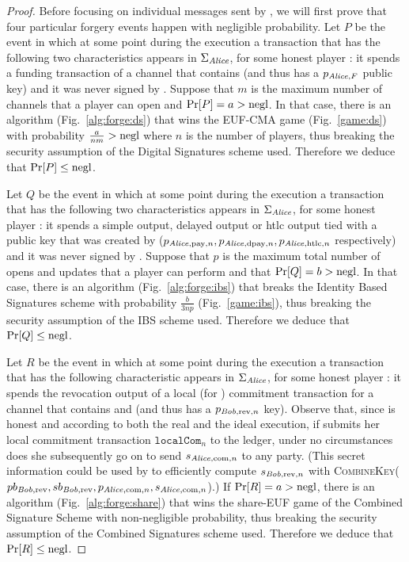\begin{proof}
  Before focusing on individual messages sent by \environment, we will first
  prove that four particular forgery events happen with negligible probability.
  Let $P$ be the event in which at some point during the execution a transaction
  that has the following two characteristics appears in $\Sigma_{\mathit{Alice}}$, for
  some honest player \alice: it spends a funding transaction of a channel that
  contains \alice{} (and thus has a $p_{\mathit{Alice}, F}$ public key) and it was never
  signed by \alice. Suppose that $m$ is the maximum number of channels that a
  player can open and $\Pr[P] = a > \text{negl}$. In that case, there is an algorithm
  (Fig.~\ref{alg:forge:ds}) that wins the \textsf{EUF-CMA} game
  (Fig.~\ref{game:ds}) with probability $\frac{a}{nm} > \text{negl}$ where $n$ is the
  number of players, thus breaking the security assumption of the Digital
  Signatures scheme used. Therefore we deduce that $\Pr[P] \leq \text{negl}$.

  Let $Q$ be the event in which at some point during the execution a transaction
  that has the following two characteristics appears in $\Sigma_{\mathit{Alice}}$, for
  some honest player \alice: it spends a simple output, delayed output or htlc
  output tied with a public key that was created by \alice{} ($p_{\mathit{Alice},
  \mathrm{pay}, n}, p_{\mathit{Alice}, \mathrm{dpay}, n}, p_{\mathit{Alice}, \mathrm{htlc}, n}$
  respectively) and it was never signed by \alice. Suppose that $p$ is the
  maximum total number of opens and updates that a player can perform and that
  $\Pr[Q] = b > \text{negl}$. In that case, there is an algorithm
  (Fig.~\ref{alg:forge:ibs}) that breaks the Identity Based Signatures scheme
  with probability $\frac{b}{3np}$ (Fig.~\ref{game:ibs}), thus breaking the
  security assumption of the IBS scheme used. Therefore we deduce that $\Pr[Q]
  \leq \text{negl}$.

  Let $R$ be the event in which at some point during the execution a transaction
  that has the following characteristic appears in $\Sigma_{\mathit{Alice}}$, for some
  honest player \alice: it spends the revocation output of a local (for
  \alice{}) commitment transaction for a channel that contains \alice{} and
  \bob{} (and thus has a $p_{\mathit{Bob}, \mathrm{rev}, n}$ key). Observe that, since
  \alice{} is honest and according to both the real and the ideal execution, if
  \alice{} submits her local commitment transaction $\mathtt{localCom}_n$ to the
  ledger, under no circumstances does she subsequently go on to send $s_{\mathit{Alice},
  \mathrm{com}, n}$ to any party. (This secret information could be used by
  \bob{} to efficiently compute $s_{\mathit{Bob}, \mathrm{rev}, n}$ with
  \textsc{CombineKey}($pb_{\mathit{Bob}, \mathrm{rev}}, sb_{\mathit{Bob}, \mathrm{rev}},
  p_{\mathit{Alice}, \mathrm{com}, n}, s_{\mathit{Alice}, \mathrm{com}, n}$).) If $\Pr[R] = a >
  \text{negl}$, there is an algorithm (Fig.~\ref{alg:forge:share}) that wins the
  \textsf{share-EUF} game of the Combined Signature Scheme with non-negligible
  probability, thus breaking the security assumption of the Combined Signatures
  scheme used. Therefore we deduce that $\Pr[R] \leq \text{negl}$.


\end{proof}
